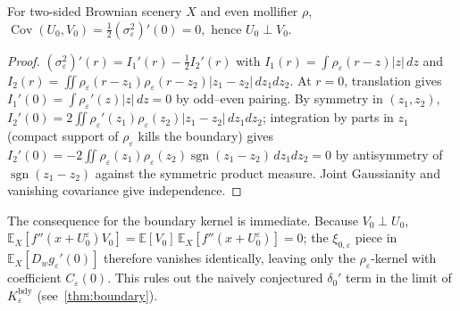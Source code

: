 \documentclass[EJP]{ejpecp}
\renewcommand{\E}{\mathbb{E}}
\DeclareMathOperator{\Cov}{Cov}
\DeclareMathOperator{\sgn}{sgn}
\begin{document}
\begin{lemma}\label{lem:bdy-cov-zero}
For two-sided Brownian scenery $X$ and even mollifier $\rho$,
\(
 \Cov(U_{0},V_{0})=\tfrac12(\sigma_{\varepsilon}^{2})'(0)=0,
\)
hence $U_{0}\perp V_{0}$.
\end{lemma}

\begin{proof}
$(\sigma_{\varepsilon}^{2})'(r)=I_{1}'(r)-\tfrac12 I_{2}'(r)$ with
$I_{1}(r)=\int\rho_{\varepsilon}(r-z)|z|\,dz$ and
$I_{2}(r)=\iint\rho_{\varepsilon}(r-z_{1})\rho_{\varepsilon}(r-z_{2})|z_{1}-z_{2}|\,dz_{1}dz_{2}$.
At $r=0$, translation gives
$I_{1}'(0)=\int\rho_{\varepsilon}'(z)|z|\,dz=0$ by odd--even pairing.
By symmetry in $(z_1,z_2)$,
$I_{2}'(0)=2\!\iint\rho_{\varepsilon}'(z_{1})\rho_{\varepsilon}(z_{2})|z_{1}-z_{2}|\,dz_{1}dz_{2}$;
integration by parts in $z_1$ (compact support of $\rho_\varepsilon$
kills the boundary) gives
$I_{2}'(0)=-2\!\iint\rho_{\varepsilon}(z_{1})\rho_{\varepsilon}(z_{2})\sgn(z_{1}-z_{2})\,dz_{1}dz_{2}=0$
by antisymmetry of $\sgn(z_1-z_2)$ against the symmetric product
measure. Joint Gaussianity and vanishing covariance give
independence.
\end{proof}

\begin{remark}
\label{rem:bdy-coeff}
The consequence for the boundary kernel is immediate. Because
$V_0\perp U_0$, $\E_X[f''(x+U_0^\varepsilon)V_0]=\E[V_0]\,\E_X[f''(x+U_0^\varepsilon)]=0$;
the $\xi_{0,\varepsilon}$ piece in $\E_X[D_w g_\varepsilon'(0)]$
therefore vanishes identically, leaving only the
$\rho_\varepsilon$-kernel with coefficient $C_\varepsilon(0)$. This
rules out the naively conjectured $\delta_0'$ term in the limit of
$K_\varepsilon^{\mathrm{bdy}}$ (see~\cref{thm:boundary}).
\end{remark}
\end{document}
